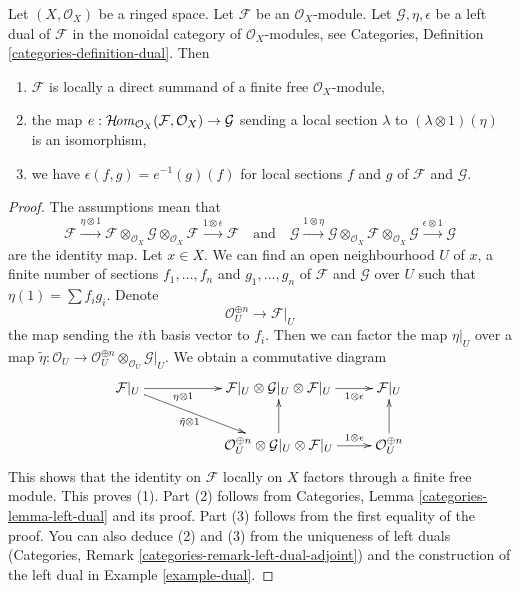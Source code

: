 \begin{lemma}
\label{lemma-left-dual-module}
Let $(X, \mathcal{O}_X)$ be a ringed space. Let $\mathcal{F}$ be an
$\mathcal{O}_X$-module. Let $\mathcal{G}, \eta, \epsilon$
be a left dual of $\mathcal{F}$ in the monoidal category of
$\mathcal{O}_X$-modules, see
Categories, Definition \ref{categories-definition-dual}. Then
\begin{enumerate}
\item $\mathcal{F}$ is locally a direct summand of a finite free
$\mathcal{O}_X$-module,
\item the map
$e : \mathop{\mathcal{H}\!\mathit{om}}\nolimits_{\mathcal{O}_X}(\mathcal{F}, \mathcal{O}_X) \to \mathcal{G}$
sending a local section $\lambda$ to $(\lambda \otimes 1)(\eta)$
is an isomorphism,
\item we have $\epsilon(f, g) = e^{-1}(g)(f)$ for local sections
$f$ and $g$ of $\mathcal{F}$ and $\mathcal{G}$.
\end{enumerate}
\end{lemma}

\begin{proof}
The assumptions mean that
$$
\mathcal{F} \xrightarrow{\eta \otimes 1}
\mathcal{F} \otimes_{\mathcal{O}_X} \mathcal{G}
\otimes_{\mathcal{O}_X} \mathcal{F}
\xrightarrow{1 \otimes \epsilon} \mathcal{F}
\quad\text{and}\quad
\mathcal{G} \xrightarrow{1 \otimes \eta}
\mathcal{G} \otimes_{\mathcal{O}_X} \mathcal{F}
\otimes_{\mathcal{O}_X} \mathcal{G}
\xrightarrow{\epsilon \otimes 1} \mathcal{G}
$$
are the identity map. Let $x \in X$. We can find an open neighbourhood
$U$ of $x$, a finite number of sections $f_1, \ldots, f_n$
and $g_1, \ldots, g_n$ of
$\mathcal{F}$ and $\mathcal{G}$ over $U$ such that
$\eta(1) = \sum f_i g_i$. Denote
$$
\mathcal{O}_U^{\oplus n} \to \mathcal{F}|_U
$$
the map sending the $i$th basis vector to $f_i$. Then we
can factor the map $\eta|_U$ over a map
$\tilde \eta : \mathcal{O}_U \to
\mathcal{O}_U^{\oplus n} \otimes_{\mathcal{O}_U} \mathcal{G}|_U$.
We obtain a commutative diagram
$$
\xymatrix{
\mathcal{F}|_U
\ar[rr]_-{\eta \otimes 1} \ar[rrd]_-{\tilde \eta \otimes 1} & &
\mathcal{F}|_U \otimes \mathcal{G}|_U \otimes \mathcal{F}|_U
\ar[r]_-{1 \otimes \epsilon} &
\mathcal{F}|_U \\
& &
\mathcal{O}_U^{\oplus n} \otimes \mathcal{G}|_U \otimes \mathcal{F}|_U
\ar[u] \ar[r]^-{1 \otimes \epsilon} &
\mathcal{O}_U^{\oplus n} \ar[u]
}
$$
This shows that the identity on $\mathcal{F}$ locally on $X$
factors through a finite free module. This proves (1). Part (2) follows from
Categories, Lemma \ref{categories-lemma-left-dual} and its proof.
Part (3) follows from the first equality of the proof.
You can also deduce (2) and (3) from the uniqueness of left duals
(Categories, Remark \ref{categories-remark-left-dual-adjoint})
and the construction of the left dual in
Example \ref{example-dual}.
\end{proof}

